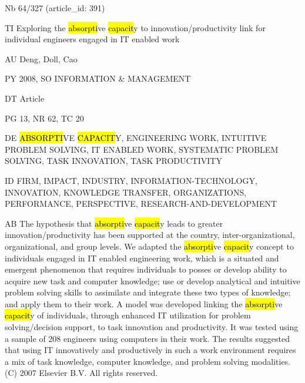 \documentclass[a4paper]{article}
\begin{document}
\vspace*{-2cm}
Nb \tabto{0cm}64/327 (article\_id: 391)\par
TI \tabto{0cm}Exploring the \hl{absorpti}ve \hl{capacit}y to innovation/productivity link for individual engineers engaged in IT enabled work\par
AU \tabto{0cm}Deng, Doll, Cao\par
PY \tabto{0cm}2008, SO INFORMATION \& MANAGEMENT\par
DT \tabto{0cm}Article\par
PG \tabto{0cm}13, NR 62, TC 20\par
DE \tabto{0cm}\hl{ABSORPTI}VE \hl{CAPACIT}Y, ENGINEERING WORK, INTUITIVE PROBLEM SOLVING, IT ENABLED WORK, SYSTEMATIC PROBLEM SOLVING, TASK INNOVATION, TASK PRODUCTIVITY\par
ID \tabto{0cm}FIRM, IMPACT, INDUSTRY, INFORMATION-TECHNOLOGY, INNOVATION, KNOWLEDGE TRANSFER, ORGANIZATIONS, PERFORMANCE, PERSPECTIVE, RESEARCH-AND-DEVELOPMENT\par
AB \tabto{0cm}The hypothesis that \hl{absorpti}ve \hl{capacit}y leads to greater innovation/productivity has been supported at the country, inter-organizational, organizational, and group levels. We adapted the \hl{absorpti}ve \hl{capacit}y concept to individuals engaged in IT enabled engineering work, which is a situated and emergent phenomenon that requires individuals to posses or develop ability to acquire new task and computer knowledge; use or develop analytical and intuitive problem solving skills to assimilate and integrate these two types of knowledge; and apply them to their work.
A model was developed linking the \hl{absorpti}ve \hl{capacit}y of individuals, through enhanced IT utilization for problem solving/decision support, to task innovation and productivity. It was tested using a sample of 208 engineers using computers in their work. The results suggested that using IT innovatively and productively in such a work environment requires a mix of task knowledge, computer knowledge, and problem solving modalities. (C) 2007 Elsevier B.V. All rights reserved.\par
\clearpage
\end{document}
